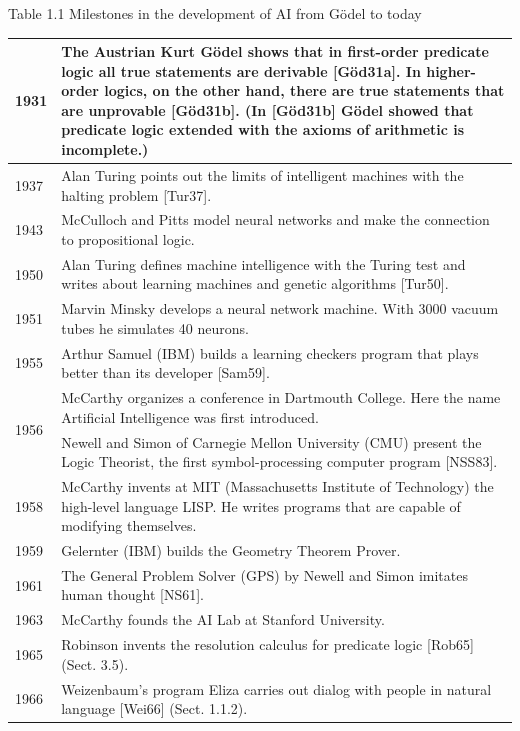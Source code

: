 \documentclass[10pt]{article}
\begin{document}
Table 1.1 Milestones in the development of AI from Gödel to today


\begin{center}
\begin{tabular}{|l|l|}
\hline
1931 & The Austrian Kurt Gödel shows that in first-order predicate logic all true statements are derivable [Göd31a]. In higher-order logics, on the other hand, there are true statements that are unprovable [Göd31b]. (In [Göd31b] Gödel showed that predicate logic extended with the axioms of arithmetic is incomplete.) \\
\hline
1937 & Alan Turing points out the limits of intelligent machines with the halting problem [Tur37]. \\
\hline
1943 & McCulloch and Pitts model neural networks and make the connection to propositional logic. \\
\hline
1950 & Alan Turing defines machine intelligence with the Turing test and writes about learning machines and genetic algorithms [Tur50]. \\
\hline
1951 & Marvin Minsky develops a neural network machine. With 3000 vacuum tubes he simulates 40 neurons. \\
\hline
1955 & Arthur Samuel (IBM) builds a learning checkers program that plays better than its developer [Sam59]. \\
\hline
\multirow[t]{2}{*}{1956} & McCarthy organizes a conference in Dartmouth College. Here the name Artificial Intelligence was first introduced. \\
\hline
 & Newell and Simon of Carnegie Mellon University (CMU) present the Logic Theorist, the first symbol-processing computer program [NSS83]. \\
\hline
1958 & McCarthy invents at MIT (Massachusetts Institute of Technology) the high-level language LISP. He writes programs that are capable of modifying themselves. \\
\hline
1959 & Gelernter (IBM) builds the Geometry Theorem Prover. \\
\hline
1961 & The General Problem Solver (GPS) by Newell and Simon imitates human thought [NS61]. \\
\hline
1963 & McCarthy founds the AI Lab at Stanford University. \\
\hline
1965 & Robinson invents the resolution calculus for predicate logic [Rob65] (Sect. 3.5). \\
\hline
1966 & Weizenbaum's program Eliza carries out dialog with people in natural language [Wei66] (Sect. 1.1.2). \\

\end{tabular}
\end{center}
\end{document}
